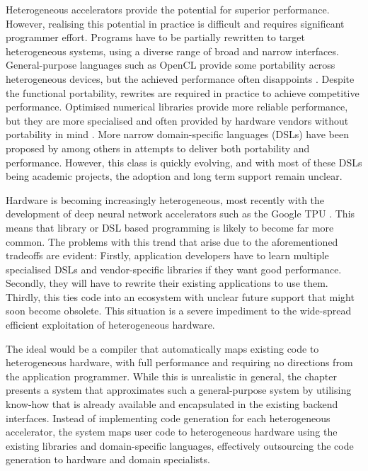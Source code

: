     Heterogeneous accelerators provide the potential for superior performance.
    However, realising this potential in practice is difficult and requires
    significant programmer effort.
    Programs have to be partially rewritten to target heterogeneous systems,
    using a diverse range of broad and narrow interfaces.
    General-purpose languages such as OpenCL \citep{nvidia11guide} provide
    some portability across heterogeneous devices, but the achieved performance
    often disappoints \citep{lee09openmp}.
    Despite the functional portability, rewrites are required in practice to
    achieve competitive performance.
    Optimised numerical libraries provide more reliable performance, but they
    are more specialised and often provided by hardware vendors without
    portability in mind \citep{clblas,cublas,cusparse,clsparse}.
    More narrow domain-specific languages (DSLs) have been proposed by
    \citet{Ragan-Kelley2013Halide,Franchetti09OL,Rompf:2012:LMS:2184319.2184345}
    among others in attempts to deliver both portability and performance.
    However, this class is quickly evolving, and with most of these DSLs being
    academic projects, the adoption and long term support remain unclear.

    Hardware is becoming increasingly heterogeneous, most recently with the
    development of deep neural network accelerators such as the Google TPU
    \citep{jouppi2017datacenter}.
    This means that library or DSL based programming is likely to become far
    more common.
    The problems with this trend that arise due to the aforementioned tradeoffs
    are evident:
    Firstly, application developers have to learn multiple specialised DSLs and
    vendor-specific libraries if they want good performance.
    Secondly, they will have to rewrite their existing applications to use them.
    Thirdly, this ties code into an ecosystem with unclear future support
    that might soon become obsolete.
    This situation is a severe impediment to the wide-spread efficient
    exploitation of heterogeneous hardware.

    The ideal would be a compiler that automatically maps existing code to
    heterogeneous hardware, with full performance and requiring no directions
    from the application programmer.
    While this is unrealistic in general, the chapter presents a system that
    approximates such a general-purpose system by utilising know-how that is
    already available and encapsulated in the existing backend interfaces.
    Instead of implementing code generation for each heterogeneous
    accelerator, the system maps user code to heterogeneous hardware using the
    existing libraries and domain-specific languages, effectively outsourcing
    the code generation to hardware and domain specialists.

